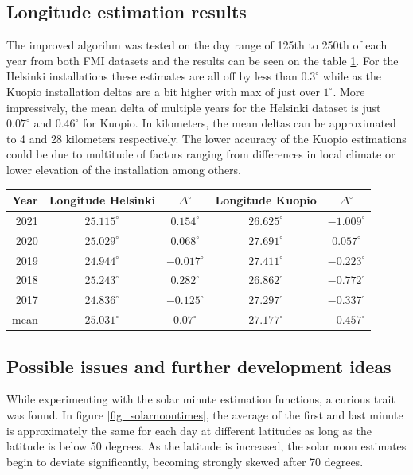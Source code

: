 \subsection{Longitude estimation results}
The improved algorihm was tested on the day range of 125th to 250th of each year from both FMI datasets and the results can be seen on the table \ref{table_geolocator_results}. For the Helsinki installations these estimates are all off by less than $0.3^\circ$ while as the Kuopio installation deltas are a bit higher with max of just over $1^\circ$. More impressively, the mean delta of multiple years for the Helsinki dataset is just $0.07^\circ$ and $0.46^\circ$ for Kuopio. In kilometers, the mean deltas can be approximated to 4 and 28 kilometers respectively. The lower accuracy of the Kuopio estimations could be due to multitude of factors ranging from differences in local climate or lower elevation of the installation among others. 




\begin{table}[ht!]%
\centering
\begin{tabular}{r|c|c|c|c} \hline\hline

 Year & Longitude Helsinki & $\Delta^\circ$  & Longitude Kuopio & $\Delta^\circ$ \\ \hline
 2021 & $25.115^\circ$  & $0.154^\circ $  & $26.625^\circ$ & $-1.009^\circ $ \\
 2020 & $25.029^\circ$ & $0.068^\circ $& $27.691^\circ$  & $0.057^\circ $ \\
 2019 & $24.944^\circ$ & $-0.017^\circ $& $27.411^\circ$ & $-0.223^\circ $  \\
 2018 & $25.243^\circ$ & $0.282^\circ $& $26.862^\circ$ & $-0.772^\circ $ \\
 2017 & $24.836^\circ$  & $-0.125^\circ $& $27.297^\circ$ & $-0.337^\circ $ \\
 mean & $25.031^\circ$  & $0.07^\circ $& $27.177^\circ$ & $-0.457^\circ $ \\
\hline\hline
\end{tabular}
\label{table_geolocator_results}
\end{table}

\newpage
\subsection{Possible issues and further development ideas}
While experimenting with the solar minute estimation functions, a curious trait was found. In figure \ref{fig_solarnoontimes}, the average of the first and last minute is approximately the same for each day at different latitudes as long as the latitude is below 50 degrees. As the latitude is increased, the solar noon estimates begin to deviate significantly, becoming strongly skewed after 70 degrees. 

